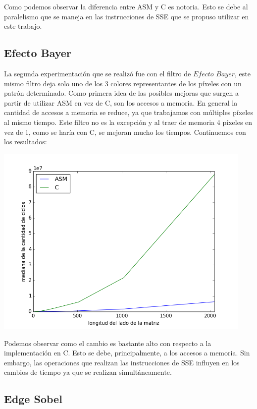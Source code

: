Como podemos observar la diferencia entre ASM y C es notoria. Esto se debe al paralelismo que se maneja en las instrucciones de SSE que se propuso utilizar en este trabajo. 

\subsection{Efecto Bayer}

La segunda experimentación que se realizó fue con el filtro de $Efecto$ $Bayer$, este mismo filtro deja solo uno de los 3 colores representantes de los píxeles con un patrón determinado. Como primera idea de las posibles mejoras que surgen a partir de utilizar ASM en vez de C, son los accesos a memoria. En general la cantidad de accesos a memoria se reduce, ya que trabajamos con múltiples píxeles al mismo tiempo. Este filtro no es la excepción y al traer de memoria 4 píxeles en vez de 1, como se haría con C, se mejoran mucho los tiempos. Continuemos con los resultados:


\vspace{6px}
\begin{center}
\includegraphics[width=12.5cm, height=9
cm]{images/car_efectoBayer.png}
\end{center}
\vspace{6px}

Podemos observar como el cambio es bastante alto con respecto a la implementación en C. Esto se debe, principalmente, a los accesos a memoria. Sin embargo, las operaciones que realizan las instrucciones de SSE influyen en los cambios de tiempo ya que se realizan simultáneamente.



\subsection{Edge Sobel}

